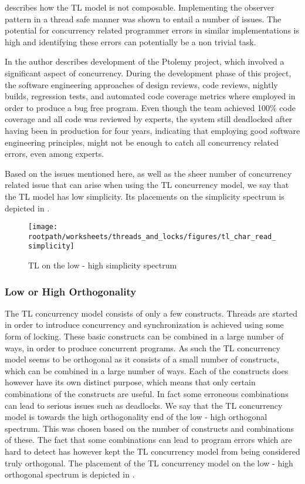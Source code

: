  describes how the \ac{TL} model is not composable. Implementing the observer pattern in a thread safe manner was shown to entail a number of issues. The potential for concurrency related programmer errors in similar implementations is high and identifying these errors can potentially be a non trivial task.

In \cite{lee2006problem} the author describes development of the Ptolemy project\cite{lee1999overview}, which involved a significant aspect of concurrency. During the development phase of this project, the software engineering approaches of design reviews, code reviews, nightly builds, regression tests, and automated code coverage metrics where employed in order to produce a bug free program\cite[p. 8]{lee2006problem}. Even though the team achieved 100\% code coverage and all code was reviewed by experts, the system still deadlocked after having been in production for four years, indicating that employing good software engineering principles, might not be enough to catch all concurrency related errors, even among experts.

Based on the issues mentioned here, as well as the sheer number of concurrency related issue that can arise when using the \ac{TL} concurrency model, we say that the \ac{TL} model has low simplicity. Its placements on the simplicity spectrum is depicted in .

\begin{figure}[htbp]
\centering
 \texttt{[image: \\rootpath/worksheets/threads\_and\_locks/figures/tl\_char\_read\_simplicity]} 
 \caption{\ac{TL} on the low - high simplicity spectrum}
\label{fig:char_read_simplicity}
\end{figure}

\subsubsection{Low or High Orthogonality}\label{sec:tl_orthogonality}
The \ac{TL} concurrency model consists of only a few constructs. Threads are started in order to introduce concurrency and synchronization is achieved using some form of locking. These basic constructs can be combined in a large number of ways, in order to produce concurrent programs. As such the \ac{TL} concurrency model seems to be orthogonal as it consists of a small number of constructs, which can be combined in a large number of ways. Each of the constructs does however have its own distinct purpose, which means that only certain combinations of the constructs are useful. In fact some erroneous combinations can lead to serious issues such as deadlocks. We say that the \ac{TL} concurrency model is towards the high orthogonality end of the low - high orthogonal spectrum. This was chosen based on the number of constructs and combinations of these. The fact that some combinations can lead to program errors which are hard to detect has however kept the \ac{TL} concurrency model from being considered truly orthogonal. The placement of the \ac{TL} concurrency model on the low - high orthogonal spectrum is depicted in .

